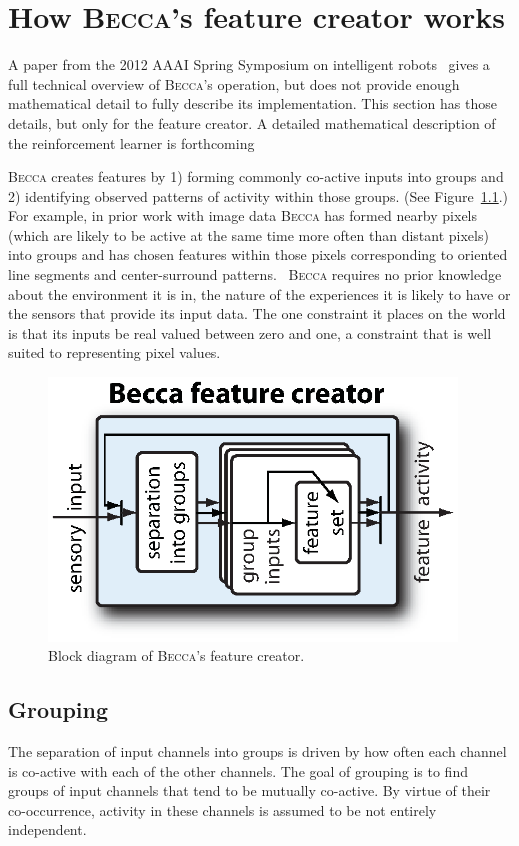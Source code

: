 \chapter{How \textsc{Becca}'s feature creator works}
\label{perceiver_chapter}

A paper from the 2012 AAAI Spring Symposium on intelligent robots~\cite{rohrer12b} gives a full technical overview of \textsc{Becca}'s operation, but does not provide enough mathematical detail to fully describe its implementation. This section has those details, but only for the feature creator. A detailed mathematical description of the reinforcement learner is forthcoming

\textsc{Becca} creates features by 1) forming commonly co-active inputs into groups and 2) identifying observed patterns of activity within those groups. (See Figure~\ref{becca_feature_creator}.) For example, in prior work with image data \textsc{Becca} has formed nearby pixels (which are likely to be active at the same time more often than distant pixels) into groups and has chosen features within those pixels corresponding to oriented line segments and center-surround patterns.~\cite{rohrer11c} \textsc{Becca} requires no prior knowledge about the environment it is in, the nature of the experiences it is likely to have or the sensors that provide its input data. The one constraint it places on the world is that its inputs be real valued between zero and one, a constraint that is well suited to representing pixel values.

\begin{figure}
\centering
\includegraphics[height=7cm]{figs/becca_feature_creator.eps}
\caption{Block diagram of \textsc{Becca}'s feature creator.}
\label{becca_feature_creator}
\end{figure}


\section{Grouping}
The separation of input channels into groups is driven by how often each channel is co-active with each of the other channels. The goal of grouping is to find groups of input channels that tend to be mutually co-active. By virtue of their co-occurrence, activity in these channels is assumed to be not entirely independent.

